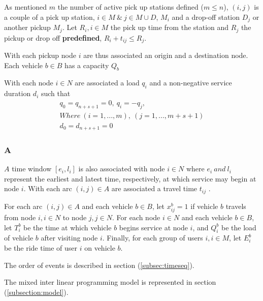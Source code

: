 \documentclass{article}
\begin{document}
As mentioned $m$ the number of active pick up stations defined ($m \leqslant n$),  $(i,j)$ is a couple of a pick up station, $i \in M\ \& \ j \in M \cup D$, $M_i$ and a drop-off station $D_j$ or another pickup $M_j$.
Let $R_i, i \in M$ the pick up time from the station and $R_j$ the pickup or drop off \textbf{predefined}, $R_i + t_{ij} \leqslant R_j$.

With each pickup node $i$ are thus associated an origin and a destination node. Each vehicle $b \in B$ has a capacity $Q_b$


With each node $i \in N$ are associated a load $q_i$ and a non-negative service duration $d_i$ such that 
\begin{equation*}
\begin{array}{l}
q_0 = q_{n+s+1} = 0, \ q_i = - q_j,\\
Where \  (i = 1, . . . , m),\ (j = 1, ... , m+s+1) \\
d_0 = d_{n+s+1} = 0
\end{array}
\end{equation*}

\subsubsection*{A}

$A$ time window $[e_i, l_i]$ is also associated with node $i \in N$ where $ e_i\ and\ l_i$ represent the earliest and latest time,
respectively, at which service may begin at node $i$. With each arc $(i, j) \in A$ are associated a travel time $t_{ij}$ .

For each arc $(i, j) \in A$ and each vehicle $b\in B$, let $x_{ij}^{b} = 1$ if vehicle $b$ travels from node $i, i \in N$ to node $j, j \in N$. For each node $ i \in N$ and each vehicle $b \in B$, let $T^{b}_{i} $ be the time at which vehicle $b$
begins service at node $i$, and $Q^{b}_{i}$ be the load of vehicle $b$ after visiting node $i$. Finally, for each group of users $i, i \in M$, let $E^{b}_{i}$ be the ride time of user $i$ on vehicle $b$.

\noindent The order of events is described in section (\ref{subsec:timeseq}).

\noindent  The mixed inter linear programming model is represented in section (\ref{subsection:model}).
\end{document}
